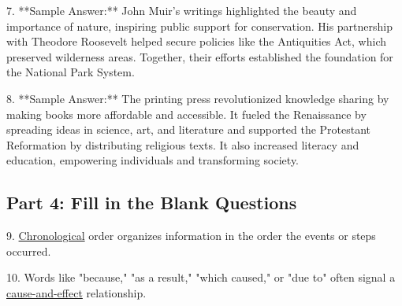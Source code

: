 \documentclass[12pt]{article}
\begin{document}
7. **Sample Answer:** John Muir’s writings highlighted the beauty and importance of nature, inspiring public support for conservation. His partnership with Theodore Roosevelt helped secure policies like the Antiquities Act, which preserved wilderness areas. Together, their efforts established the foundation for the National Park System.

8. **Sample Answer:** The printing press revolutionized knowledge sharing by making books more affordable and accessible. It fueled the Renaissance by spreading ideas in science, art, and literature and supported the Protestant Reformation by distributing religious texts. It also increased literacy and education, empowering individuals and transforming society.

\subsection*{Part 4: Fill in the Blank Questions}

9. \underline{Chronological} order organizes information in the order the events or steps occurred.

10. Words like "because," "as a result," "which caused," or "due to" often signal a \underline{cause-and-effect} relationship.
\end{document}
